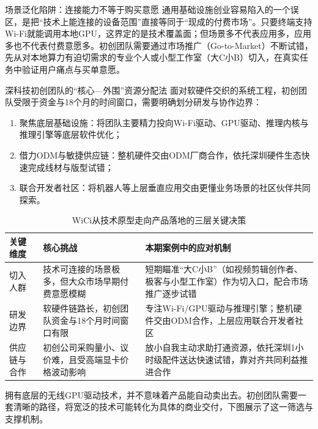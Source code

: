 \documentclass[UTF8,a4paper,11pt,fontset=fandol]{ctexart}
\begin{document}
\begin{warningbox}{场景泛化陷阱：连接能力不等于购买意愿}
通用基础设施创业容易陷入的一个误区，是把“技术上能连接的设备范围”直接等同于“现成的付费市场”。只要终端支持Wi-Fi就能调用本地GPU，这界定的是技术覆盖面；但场景多不代表应用多，应用多也不代表付费意愿多。初创团队需要通过市场推广（Go-to-Market）不断试错，先从对本地算力有迫切需求的专业个人或小型工作室（大C小B）切入，在真实任务中验证用户痛点与买单意愿。
\end{warningbox}
\begin{importantbox}{深科技初创团队的“核心—外围”资源分配法}
面对软硬件交织的系统工程，初创团队受限于资金与18个月的时间窗口，需要明确划分研发与协作边界：
\begin{enumerate}
\item 聚焦底层基础设施：将团队主要精力投向Wi-Fi驱动、GPU驱动、推理内核与推理引擎等底层软件优化；
\item 借力ODM与敏捷供应链：整机硬件交由ODM厂商合作，依托深圳硬件生态快速完成线材与版型试错；
\item 联合开发者社区：将机器人等上层垂直应用交由更懂业务场景的社区伙伴共同探索。
\end{enumerate}
\end{importantbox}
\begin{table}[H]\centering\small
\caption{WiCi从技术原型走向产品落地的三层关键决策}
\begin{tabular}{>{\raggedright\arraybackslash}p{\dimexpr(\linewidth-6\tabcolsep)/3\relax}>{\raggedright\arraybackslash}p{\dimexpr(\linewidth-6\tabcolsep)/3\relax}>{\raggedright\arraybackslash}p{\dimexpr(\linewidth-6\tabcolsep)/3\relax}}
\toprule
关键维度 & 核心挑战 & 本期案例中的应对机制\\\midrule
切入人群 & 技术可连接的场景极多，但大众市场早期付费意愿模糊 & 短期瞄准“大C小B”（如视频剪辑创作者、极客与小型工作室）作为切入口，配合市场推广逐步试错\\[4pt]
研发边界 & 软硬件链路长，初创团队资金与18个月时间窗口有限 & 专注Wi-Fi/GPU驱动与推理引擎；整机硬件交由ODM合作，上层应用联合开发者社区\\[4pt]
供应链与合作 & 初创公司采购量小、议价难，且受高端显卡价格波动影响 & 放小自我主动求助打通资源，依托深圳1小时级配件送达快速试错，靠对齐共同利益推进合作\\[4pt]
\bottomrule\end{tabular}\end{table}
拥有底层的无线GPU驱动技术，并不意味着产品能自动卖出去。初创团队需要一套清晰的路径，将宽泛的技术可能转化为具体的商业交付，下图展示了这一筛选与支撑机制。
\end{document}
